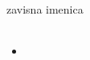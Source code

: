 \documentclass[intermediate]{grampig}
\begin{document}
	\begin{minipage}{\width}
		 \hfill zavisna imenica \br
		
		\begin{table}
			\centering
			\begin{tabular}{@{}ccccc@{}}
			\end{tabular}
		\end{table}
		
		\begin{itemize}
			\item
		\end{itemize}
	\end{minipage}
\end{document}
